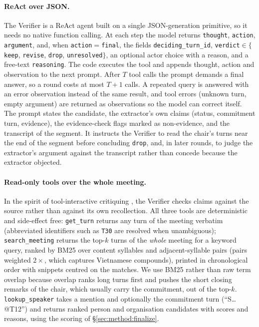 \paragraph{ReAct over JSON.}
The Verifier is a ReAct agent \citep{yao2023react} built on a single JSON-generation primitive, so it needs no native function calling.
At each step the model returns \texttt{thought}, \texttt{action}, \texttt{argument}, and, when \texttt{action}$=$\texttt{final}, the fields \texttt{deciding\_turn\_id}, \texttt{verdict}$\in\{$\texttt{keep}, \texttt{revise}, \texttt{drop}, \texttt{unresolved}$\}$, an optional actor choice with a reason, and a free-text \texttt{reasoning}.
The code executes the tool and appends thought, action and observation to the next prompt.
After $T$ tool calls the prompt demands a final answer, so a round costs at most $T{+}1$ calls.
A repeated query is answered with an error observation instead of the same result, and tool errors (unknown turn, empty argument) are returned as observations so the model can correct itself.
The prompt states the candidate, the extractor's own claims (status, commitment turn, evidence), the evidence-check flags marked as non-evidence, and the transcript of the segment.
It instructs the Verifier to read the chair's turns near the end of the segment before concluding \texttt{drop}, and, in later rounds, to judge the extractor's argument against the transcript rather than concede because the extractor objected.

\paragraph{Read-only tools over the whole meeting.}
In the spirit of tool-interactive critiquing \citep{gou2024critic}, the Verifier checks claims against the source rather than against its own recollection.
All three tools are deterministic and side-effect free:
\texttt{get\_turn} returns any turn of the meeting verbatim (abbreviated identifiers such as \texttt{T30} are resolved when unambiguous);
\texttt{search\_meeting} returns the top-$k$ turns of the \emph{whole} meeting for a keyword query, ranked by BM25 \citep{robertson2009bm25} over content syllables and adjacent-syllable pairs (pairs weighted $2\times$, which captures Vietnamese compounds), printed in chronological order with snippets centred on the matches.
We use BM25 rather than raw term overlap because overlap ranks long turns first and pushes the short closing remarks of the chair, which usually carry the commitment, out of the top-$k$.
\texttt{lookup\_speaker} takes a mention and optionally the commitment turn (``S\ldots{} @T12'') and returns ranked person and organisation candidates with scores and reasons, using the scoring of \S\ref{sec:method:finalize}.

